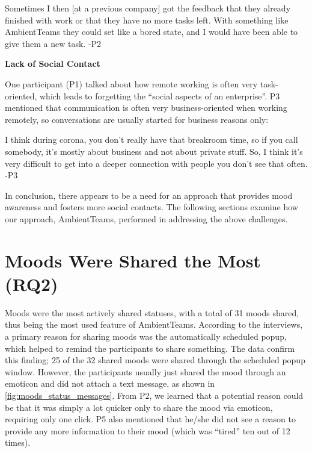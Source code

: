 \begin{displayquote}
    Sometimes I then [at a previous company] got the feedback that they already finished with work or that they have no more tasks left. With something like AmbientTeams they could set like a bored state, and I would have been able to give them a new task. -P2
\end{displayquote}

\bigskip\noindent\textbf{Lack of Social Contact}

\medskip\noindent One participant (P1) talked about how remote working is often very task-oriented, which leads to forgetting the \enquote{social aspects of an enterprise}. P3 mentioned that communication is often very business-oriented when working remotely, so conversations are usually started for business reasons only:

\begin{displayquote}
    I think during corona, you don't really have that breakroom time, so if you call somebody, it's mostly about business and not about private stuff. So, I think it's very difficult to get into a deeper connection with people you don't see that often. -P3
\end{displayquote}

In conclusion, there appears to be a need for an approach that provides mood awareness and fosters more social contacts. The following sections examine how our approach, AmbientTeams, performed in addressing the above challenges.

\section{Moods Were Shared the Most (RQ2)}
Moods were the most actively shared statuses, with a total of 31 moods shared, thus being the most used feature of AmbientTeams. According to the interviews, a primary reason for sharing moods was the automatically scheduled popup, which helped to remind the participants to share something. The data confirm this finding; 25 of the 32 shared moods were shared through the scheduled popup window. However, the participants usually just shared the mood through an emoticon and did not attach a text message, as shown in \autoref{fig:moods_status_messages}. From P2, we learned that a potential reason could be that it was simply a lot quicker only to share the mood via emoticon, requiring only one click. P5 also mentioned that he/she did not see a reason to provide any more information to their mood (which was \enquote{tired} ten out of 12 times).

